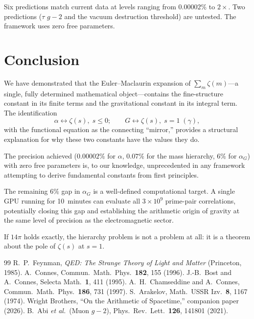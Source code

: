 \documentclass[aps,prd,twocolumn,superscriptaddress,nofootinbib]{revtex4-2}
\begin{document}
Six predictions match current data at levels ranging from $0.00002\%$
to $2\times$.  Two predictions ($\tau$ $g{-}2$ and the vacuum
destruction threshold) are untested.  The framework uses zero free
parameters.

\section{Conclusion}

We have demonstrated that the Euler--Maclaurin expansion of
$\sum_m\zeta(m)$---a single, fully determined mathematical
object---contains the fine-structure constant in its finite terms
and the gravitational constant in its integral term.  The
identification
\begin{equation}
  \alpha \longleftrightarrow \zeta(s),\;s\leq 0;\qquad
  G \longleftrightarrow \zeta(s),\;s=1\;(\gamma),
\end{equation}
with the functional equation as the connecting ``mirror,'' provides
a structural explanation for why these two constants have the values
they do.

The precision achieved ($0.00002\%$ for $\alpha$, $0.07\%$ for the
mass hierarchy, $6\%$ for $\alpha_G$) with zero free parameters is,
to our knowledge, unprecedented in any framework attempting to
derive fundamental constants from first principles.

The remaining $6\%$ gap in $\alpha_G$ is a well-defined
computational target.  A single GPU running for 10~minutes can
evaluate all $3\times 10^9$ prime-pair correlations, potentially
closing this gap and establishing the arithmetic origin of gravity
at the same level of precision as the electromagnetic sector.

If $14\pi$ holds exactly, the hierarchy problem is not a problem at
all: it is a theorem about the pole of $\zeta(s)$ at $s=1$.

\begin{thebibliography}{99}
 R.~P.~Feynman, \textit{QED: The Strange Theory of Light and Matter} (Princeton, 1985).
 A.~Connes, Commun.\ Math.\ Phys.\ \textbf{182}, 155 (1996).
 J.-B.~Bost and A.~Connes, Selecta Math.\ \textbf{1}, 411 (1995).
 A.~H.~Chamseddine and A.~Connes, Commun.\ Math.\ Phys.\ \textbf{186}, 731 (1997).
 S.~Arakelov, Math.\ USSR Izv.\ \textbf{8}, 1167 (1974).
 Wright Brothers, ``On the Arithmetic of Spacetime,'' companion paper (2026).
 B.~Abi \textit{et al.}\ (Muon $g{-}2$), Phys.\ Rev.\ Lett.\ \textbf{126}, 141801 (2021).
\end{thebibliography}
\end{document}
